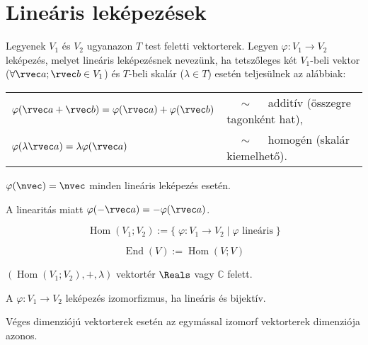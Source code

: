 \clearpage
\section{Lineáris leképezések}\label{sec-01-04}

\begin{definition}
  Legyenek $V_1$ és $V_2$ ugyanazon $T$ test feletti vektorterek. Legyen
  $\varphi: V_1 \rightarrow V_2$ leképezés, melyet lineáris leképezésnek
  nevezünk, ha tetszőleges két $V_1$-beli vektor ($\forall \rvec a; \rvec b \in
    V_1$) és $T$-beli skalár ($\lambda \in T$) esetén teljesülnek az alábbiak:

  \def\arraystretch{1.5}
  \begin{tabular}{>{\bullet\;}l>{$\quad \sim \quad$}l}
    $\varphi(\rvec a + \rvec b) = \varphi(\rvec a) + \varphi(\rvec b)$
     & additív (összegre tagonként hat), \\
    $\varphi(\lambda \rvec a) = \lambda \varphi(\rvec a)$
     & homogén (skalár kiemelhető).
  \end{tabular}
\end{definition}

\begin{note}
  $\varphi(\nvec) = \nvec$ minden lineáris leképezés esetén.

  A linearitás miatt $\varphi(-\rvec a) = - \varphi(\rvec a)$.
\end{note}

\begin{definition}[Homomorfizmus]
  $$
    \operatorname{Hom} (V_1; V_2) := \big\{\;
    \varphi: V_1 \to V_2 \; \big| \; \varphi \text{ lineáris}
    \;\big\}
  $$
\end{definition}

\begin{definition}[Endomorfizmus]
  $$
    \operatorname{End} (V) := \operatorname{Hom} (V; V)
  $$
\end{definition}

\begin{statement}
  $(\operatorname{Hom} (V_1; V_2), +, \lambda)$  vektortér $\Reals$ vagy
  $\mathbb C$ felett.
\end{statement}

\begin{definition}[Izomorfizmus]
  A $\varphi: V_1 \to V_2$ leképezés izomorfizmus, ha lineáris és bijektív.
\end{definition}

\begin{statement}
  Véges dimenziójú vektorterek esetén az egymással izomorf vektorterek dimenziója
  azonos.
\end{statement}


